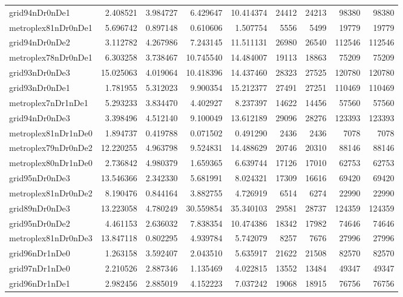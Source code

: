 \begin{longtable}{|l|r|r|r|r|r|r|r|r|}
grid94nDr0nDe1 & 2.408521 & 3.984727 & 6.429647 & 10.414374 & 24412 & 24213 & 98380 & 98380 \\
metroplex81nDr0nDe1 & 5.696742 & 0.897148 & 0.610606 & 1.507754 & 5556 & 5499 & 19779 & 19779 \\
grid94nDr0nDe2 & 3.112782 & 4.267986 & 7.243145 & 11.511131 & 26980 & 26540 & 112546 & 112546 \\
metroplex78nDr0nDe1 & 6.303258 & 3.738467 & 10.745540 & 14.484007 & 19113 & 18863 & 75209 & 75209 \\
grid93nDr0nDe3 & 15.025063 & 4.019064 & 10.418396 & 14.437460 & 28323 & 27525 & 120780 & 120780 \\
grid93nDr0nDe1 & 1.781955 & 5.312023 & 9.900354 & 15.212377 & 27491 & 27251 & 110469 & 110469 \\
metroplex7nDr1nDe1 & 5.293233 & 3.834470 & 4.402927 & 8.237397 & 14622 & 14456 & 57560 & 57560 \\
grid94nDr0nDe3 & 3.398496 & 4.512140 & 9.100049 & 13.612189 & 29096 & 28276 & 123393 & 123393 \\
metroplex81nDr1nDe0 & 1.894737 & 0.419788 & 0.071502 & 0.491290 & 2436 & 2436 & 7078 & 7078 \\
metroplex79nDr0nDe2 & 12.220255 & 4.963798 & 9.524831 & 14.488629 & 20746 & 20310 & 88146 & 88146 \\
metroplex80nDr1nDe0 & 2.736842 & 4.980379 & 1.659365 & 6.639744 & 17126 & 17010 & 62753 & 62753 \\
grid95nDr0nDe3 & 13.546366 & 2.342330 & 5.681991 & 8.024321 & 17309 & 16616 & 69420 & 69420 \\
metroplex81nDr0nDe2 & 8.190476 & 0.844164 & 3.882755 & 4.726919 & 6514 & 6274 & 22990 & 22990 \\
grid89nDr0nDe3 & 13.223058 & 4.780249 & 30.559854 & 35.340103 & 29581 & 28737 & 124359 & 124359 \\
grid95nDr0nDe2 & 4.461153 & 2.636032 & 7.838354 & 10.474386 & 18342 & 17982 & 74646 & 74646 \\
metroplex81nDr0nDe3 & 13.847118 & 0.802295 & 4.939784 & 5.742079 & 8257 & 7676 & 27996 & 27996 \\
grid96nDr1nDe0 & 1.263158 & 3.592407 & 2.043510 & 5.635917 & 21622 & 21508 & 82570 & 82570 \\
grid97nDr1nDe0 & 2.210526 & 2.887346 & 1.135469 & 4.022815 & 13552 & 13484 & 49347 & 49347 \\
grid96nDr1nDe1 & 2.982456 & 2.885019 & 4.152223 & 7.037242 & 19068 & 18915 & 76756 & 76756 \\

\end{longtable}
